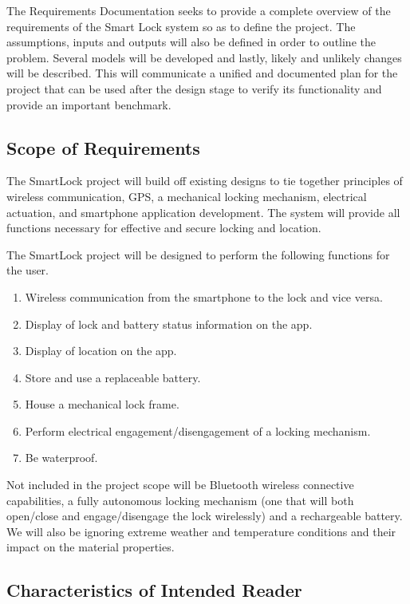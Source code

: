 \documentclass[12pt]{article}
\begin{document}
The Requirements Documentation seeks to provide a complete overview of the requirements of the Smart Lock system so as to define the project. The assumptions, inputs and outputs will also be defined in order to outline the problem. Several models will be developed and lastly, likely and unlikely changes will be described. This will communicate a unified and documented plan for the project that can be used after the design stage to verify its functionality and provide an important benchmark. 

\subsection{Scope of Requirements} 

The SmartLock project will build off existing designs to tie together principles of wireless communication, GPS, a mechanical locking mechanism, electrical actuation, and smartphone application development. The system will provide all functions necessary for effective and secure locking and location.  

The SmartLock project will be designed to perform the following functions for the user.  

\begin{enumerate}
\item Wireless communication from the smartphone to the lock and vice versa. 
\item Display of lock and battery status information on the app. 
\item Display of location on the app. 
\item Store and use a replaceable battery. 
\item House a mechanical lock frame. 
\item Perform electrical engagement/disengagement of a locking mechanism. 
\item Be waterproof. 
\end{enumerate}

Not included in the project scope will be Bluetooth wireless connective capabilities, a fully autonomous locking mechanism (one that will both open/close and engage/disengage the lock wirelessly) and a rechargeable battery. We will also be ignoring extreme weather and temperature conditions and their impact on the material properties.

\subsection{Characteristics of Intended Reader} \label{sec_IntendedReader}
\end{document}
